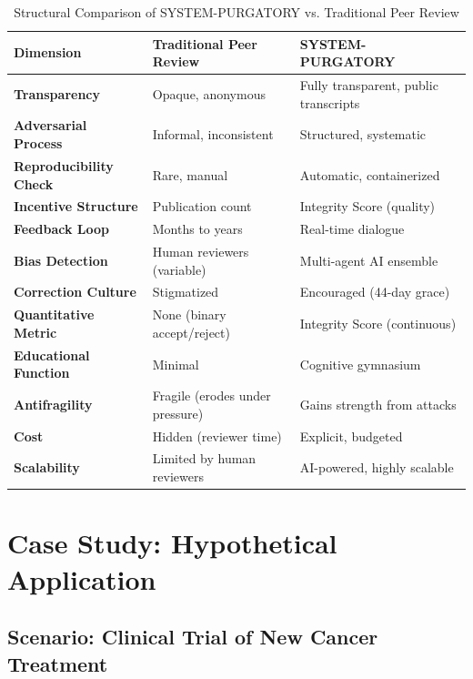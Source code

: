 \documentclass[11pt,a4paper]{article}
\begin{document}
\begin{small}
\begin{table}[h!]
\centering
\caption{Structural Comparison of SYSTEM-PURGATORY vs. Traditional Peer Review}
\label{tab:comparison}
\begin{tabular}{@{}p{4cm}p{5cm}p{5cm}@{}}
\toprule
\textbf{Dimension} & \textbf{Traditional Peer Review} & \textbf{SYSTEM-PURGATORY} \\
\midrule
\textbf{Transparency} & Opaque, anonymous & Fully transparent, public transcripts \\
\addlinespace
\textbf{Adversarial Process} & Informal, inconsistent & Structured, systematic \\
\addlinespace
\textbf{Reproducibility Check} & Rare, manual & Automatic, containerized \\
\addlinespace
\textbf{Incentive Structure} & Publication count & Integrity Score (quality) \\
\addlinespace
\textbf{Feedback Loop} & Months to years & Real-time dialogue \\
\addlinespace
\textbf{Bias Detection} & Human reviewers (variable) & Multi-agent AI ensemble \\
\addlinespace
\textbf{Correction Culture} & Stigmatized & Encouraged (44-day grace) \\
\addlinespace
\textbf{Quantitative Metric} & None (binary accept/reject) & Integrity Score (continuous) \\
\addlinespace
\textbf{Educational Function} & Minimal & Cognitive gymnasium \\
\addlinespace
\textbf{Antifragility} & Fragile (erodes under pressure) & Gains strength from attacks \\
\addlinespace
\textbf{Cost} & Hidden (reviewer time) & Explicit, budgeted \\
\addlinespace
\textbf{Scalability} & Limited by human reviewers & AI-powered, highly scalable \\
\bottomrule
\end{tabular}
\end{table}

\section{Case Study: Hypothetical Application}
\label{app:casestudy}

\subsection*{Scenario: Clinical Trial of New Cancer Treatment}


\end{small}
\end{document}
